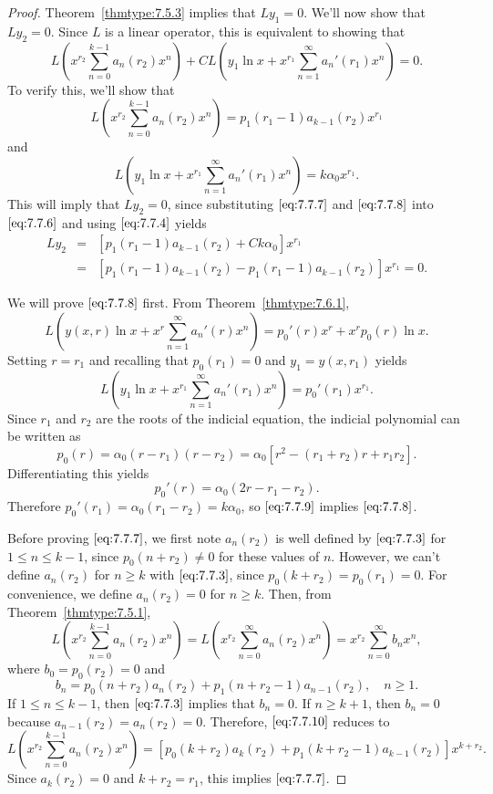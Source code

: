 \documentclass{ximera}
\begin{document}
\begin{proof}  Theorem~\ref{thmtype:7.5.3} implies that $Ly_1=0$.
We'll now show that $Ly_2=0$.
Since $L$  is a linear operator, this is equivalent to
showing that
\begin{equation} \label{eq:7.7.6}
L\left(
x^{r_2}\sum_{n=0}^{k-1}a_n(r_2)x^n\right)+CL\left(y_1\ln
x+x^{r_1}\sum_{n=1}^\infty a_n'(r_1)x^n\right)=0.
\end{equation}
To verify this, we'll show that
\begin{equation} \label{eq:7.7.7}
L\left(x^{r_2}\sum_{n=0}^{k-1}
a_n(r_2)x^n\right)=p_1(r_1-1)a_{k-1}(r_2)x^{r_1}
\end{equation}
and
\begin{equation} \label{eq:7.7.8}
L\left(y_1\ln x+x^{r_1}\sum_{n=1}^\infty
a_n'(r_1)x^n\right)=k\alpha_0x^{r_1}.
\end{equation}
This will imply that $Ly_2=0$, since substituting $\eqref{eq:7.7.7}$
and $\eqref{eq:7.7.8}$ into $\eqref{eq:7.7.6}$ and using $\eqref{eq:7.7.4}$
yields
\begin{eqnarray*}
Ly_2&=&\left[p_1(r_1-1)a_{k-1}(r_2)+Ck\alpha_0\right]x^{r_1}\\
&=&\left[p_1(r_1-1)a_{k-1}(r_2)-p_1(r_1-1)a_{k-1}(r_2)\right]x^{r_1}=0.
\end{eqnarray*}


We will prove $\eqref{eq:7.7.8}$ first. From
Theorem~\ref{thmtype:7.6.1},
$$
L\left(y(x,r)\ln x+x^r\sum_{n=1}^\infty
a_n'(r)x^n\right)=p_0'(r)x^r+x^rp_0(r)\ln x.
$$
Setting $r=r_1$ and recalling that $p_0(r_1)=0$ and $y_1=y(x,r_1)$
yields
\begin{equation} \label{eq:7.7.9}
L\left(y_1\ln x+x^{r_1}\sum_{n=1}^\infty
a_n'(r_1)x^n\right)=p_0'(r_1)x^{r_1}.
\end{equation}
Since $r_1$ and $r_2$ are the roots of the indicial equation, the
indicial polynomial can be written as
$$
p_0(r)=\alpha_0(r-r_1)(r-r_2)=\alpha_0\left[r^2-(r_1+r_2)r+r_1r_2\right].
$$
Differentiating this yields
$$
p_0'(r)=\alpha_0(2r-r_1-r_2).
$$
Therefore $p_0'(r_1)=\alpha_0(r_1-r_2)=k\alpha_0$,
so $\eqref{eq:7.7.9}$ implies $\eqref{eq:7.7.8}$.

Before proving $\eqref{eq:7.7.7}$, we first note $a_n(r_2)$ is well
defined by $\eqref{eq:7.7.3}$ for $1\leq n\leq k-1$, since $p_0(n+r_2)\neq 0$
for these values of $n$. However, we can't define $a_n(r_2)$ for
$n\geq k$ with $\eqref{eq:7.7.3}$, since $p_0(k+r_2)=p_0(r_1)=0$.
For convenience, we define  $a_n(r_2)=0$ for $n\geq k$. Then, from
Theorem~\ref{thmtype:7.5.1},
\begin{equation} \label{eq:7.7.10}
L\left(x^{r_2}\sum_{n=0}^{k-1} a_n(r_2)x^n\right)=
L\left(x^{r_2}\sum_{n=0}^\infty a_n(r_2)x^n\right)=
x^{r_2}\sum_{n=0}^\infty b_nx^n,
\end{equation}
where $b_0=p_0(r_2)=0$  and
$$
b_n=p_0(n+r_2)a_n(r_2)+p_1(n+r_2-1)a_{n-1}(r_2),\quad n\geq 1.
$$
If $1\leq n\leq k-1$, then $\eqref{eq:7.7.3}$ implies that $b_n=0$.
If $n\geq k+1$, then $b_n=0$  because $a_{n-1}(r_2)=a_n(r_2)=0$.
Therefore, $\eqref{eq:7.7.10}$ reduces to
$$
L\left(x^{r_2}\sum_{n=0}^{k-1} a_n(r_2)x^n\right)=
\left[p_0(k+r_2)a_k(r_2)+p_1(k+r_2-1)a_{k-1}(r_2)
\right]x^{k+r_2}.
$$
Since $a_k(r_2)=0$ and $k+r_2=r_1$, this implies $\eqref{eq:7.7.7}$.


\end{proof}
\end{document}
